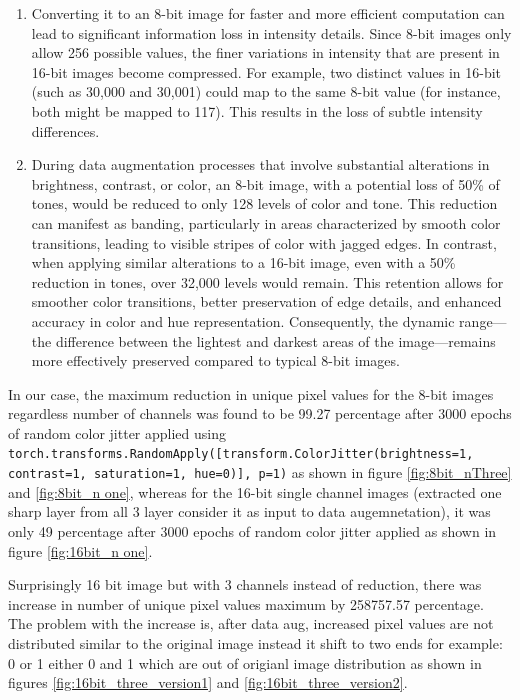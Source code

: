 \documentclass[12pt,twoside,a4paper,parskip]{scrbook} %
\begin{document}
\begin{enumerate}
  \item Converting it to an 8-bit image for faster and more efficient computation can lead to significant information loss in intensity details. Since 8-bit images only allow 256 possible values, the finer variations in intensity that are present in 16-bit images become compressed. For example, two distinct values in 16-bit (such as 30,000 and 30,001) could map to the same 8-bit value (for instance, both might be mapped to 117). This results in the loss of subtle intensity differences. 

  \item During data augmentation processes that involve substantial alterations in brightness, contrast, or color, an 8-bit image, with a potential loss of 50\% of tones, would be reduced to only 128 levels of color and tone. This reduction can manifest as banding, particularly in areas characterized by smooth color transitions, leading to visible stripes of color with jagged edges. In contrast, when applying similar alterations to a 16-bit image, even with a 50\% reduction in tones, over 32,000 levels would remain. This retention allows for smoother color transitions, better preservation of edge details, and enhanced accuracy in color and hue representation. Consequently, the dynamic range—the difference between the lightest and darkest areas of the image—remains more effectively preserved compared to typical 8-bit images.
\end{enumerate}
In our case, the maximum reduction in unique pixel values for the 8-bit  images regardless number of channels was found to be 99.27 percentage after 3000 epochs of random
color jitter applied  using \texttt{torch.transforms.RandomApply([transform.ColorJitter(brightness=1, contrast=1, saturation=1, hue=0)], p=1)} as shown in figure \ref{fig:8bit_nThree} and \ref{fig:8bit_n one}, whereas for the 16-bit single channel images (extracted one sharp layer from all 3 layer consider it as input to data augemnetation), it was only 49 percentage after 3000 epochs of random color jitter applied as shown in figure \ref{fig:16bit_n one}.

Surprisingly 16 bit image but with 3 channels instead of reduction, there was increase in number of unique pixel values maximum by 258757.57 percentage. The problem with the increase is, after data aug, increased pixel values are not distributed similar to the original image instead it shift to two ends for example: 0 or 1 either 0 and 1 which are out of origianl image distribution as shown in figures \ref{fig:16bit_three_version1} and \ref{fig:16bit_three_version2}.
\end{document}
